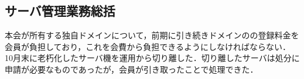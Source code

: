 \subsection*{サーバ管理業務総括}

本会が所有する独自ドメインについて，前期に引き続きドメインのの登録料金を会員が負担しており，これを会費から負担できるようにしなければならない．
10月末に老朽化したサーバ機を運用から切り離した．切り離したサーバは処分に申請が必要なものであったが，会員が引き取ったことで処理できた．

